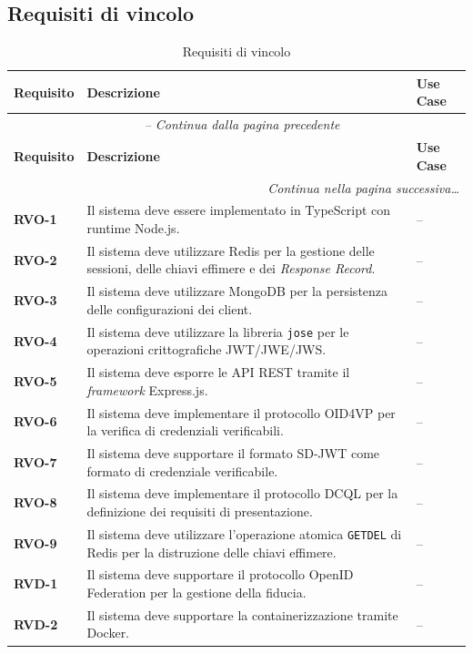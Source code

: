 \subsection{Requisiti di vincolo}
\begin{longtable}{p{1.8cm} p{8.4cm} p{2.2cm}}
\caption{Requisiti di vincolo} \label{tab:requisiti_vincolo} \\
\toprule
\textbf{Requisito} & \textbf{Descrizione} & \textbf{Use Case} \\
\midrule
\endfirsthead

\multicolumn{3}{c}{\textit{\tablename\ \thetable{} -- Continua dalla pagina precedente}} \\
\midrule
\textbf{Requisito} & \textbf{Descrizione} & \textbf{Use Case} \\
\midrule
\endhead

\midrule
\multicolumn{3}{r}{\textit{Continua nella pagina successiva\dots}} \\
\endfoot

\bottomrule
\endlastfoot

\textbf{RVO-1} & Il sistema deve essere implementato in TypeScript con runtime Node.js. & -- \\
\hline
\textbf{RVO-2} & Il sistema deve utilizzare Redis per la gestione delle sessioni, delle chiavi effimere e dei \textit{Response Record}. & -- \\
\hline
\textbf{RVO-3} & Il sistema deve utilizzare MongoDB per la persistenza delle configurazioni dei client. & -- \\
\hline
\textbf{RVO-4} & Il sistema deve utilizzare la libreria \texttt{jose} per le operazioni crittografiche JWT\glsadd{jwt}\glsadd{jwtg}/JWE\glsadd{jwe}\glsadd{jweg}/JWS\glsadd{jws}\glsadd{jwsg}. & -- \\
\hline
\textbf{RVO-5} & Il sistema deve esporre le API\glsadd{apig} REST tramite il \textit{framework} Express.js. & -- \\
\hline
\textbf{RVO-6} & Il sistema deve implementare il protocollo OID4VP\glsadd{oid4vp}\glsadd{oid4vpg} per la verifica di credenziali verificabili. & -- \\
\hline
\textbf{RVO-7} & Il sistema deve supportare il formato SD-JWT\glsadd{sdjwtg} come formato di credenziale verificabile. & -- \\
\hline
\textbf{RVO-8} & Il sistema deve implementare il protocollo DCQL\glsadd{dcqlg} per la definizione dei requisiti di presentazione. & -- \\
\hline
\textbf{RVO-9} & Il sistema deve utilizzare l'operazione atomica \texttt{GETDEL} di Redis per la distruzione delle chiavi effimere. & -- \\
\hline
\textbf{RVD-1} & Il sistema deve supportare il protocollo OpenID Federation per la gestione della fiducia. & -- \\
\hline
\textbf{RVD-2} & Il sistema deve supportare la containerizzazione tramite Docker. & -- \\
\end{longtable}


